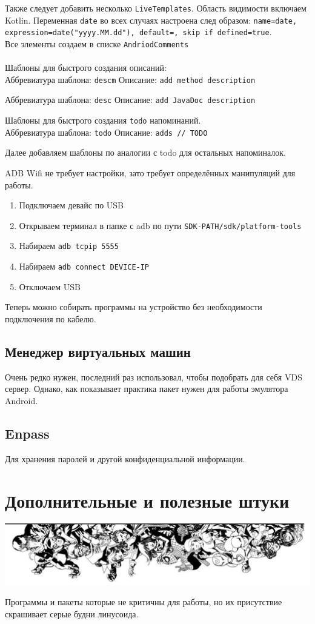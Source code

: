 \documentclass[a4paper, 12pt]{report}
\begin{document}
Также следует добавить несколько \lstinline|LiveTemplates|. Область видимости включаем Kotlin. Переменная \lstinline|date| во всех случаях настроена след образом: \lstinline|name=date, expression=date("yyyy.MM.dd"), default=, skip if defined=true|.\\
Все элементы создаем в списке \lstinline|AndriodComments|\\\\
Шаблоны для быстрого создания описаний:\\
Аббревиатура шаблона: \lstinline|descm|
Описание: \lstinline|add method description|

Аббревиатура шаблона: \lstinline|desc|
Описание: \lstinline|add JavaDoc description|

Шаблоны для быстрого создания \lstinline|todo| напоминаний.\\
Аббревиатура шаблона: \lstinline|todo|
Описание: \lstinline|adds // TODO|

Далее добавляем шаблоны по аналогии с todo для остальных напоминалок.

ADB Wifi не требует настройки, зато требует определённых манипуляций для работы.
\begin{enumerate}
	\item Подключаем девайс по USB
	\item Открываем терминал в папке с adb по пути \lstinline|SDK-PATH/sdk/platform-tools|
	\item Набираем \lstinline|adb tcpip 5555|
	\item Набираем \lstinline|adb connect DEVICE-IP|
	\item Отключаем USB
\end{enumerate}
Теперь можно собирать программы на устройство без необходимости подключения по кабелю.

\subsection{Менеджер виртуальных машин} Очень редко нужен, последний раз использовал, чтобы подобрать для себя VDS сервер. Однако, как показывает практика пакет нужен для работы эмулятора Android.
\subsection{Enpass} Для хранения паролей и другой конфиденциальной информации.


\clearpage
\section{Дополнительные и полезные штуки} 
\begin{center}
	\includegraphics[scale=0.3]{comics}
\end{center} 
Программы и пакеты которые не критичны для работы, но их присутствие скрашивает серые будни линусоида.
\end{document}
